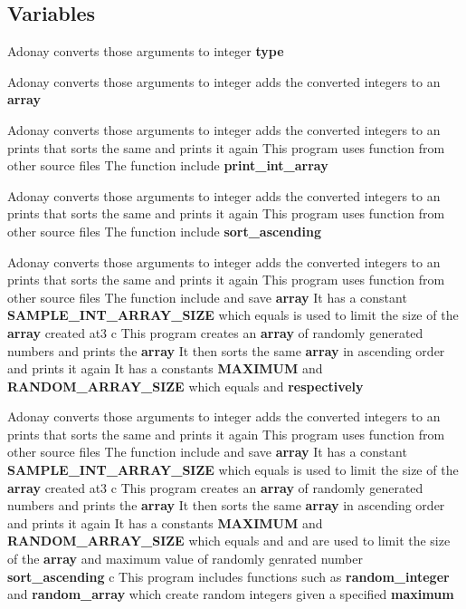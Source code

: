 \subsection*{Variables}
\begin{DoxyCompactItemize}
\item 
Adonay converts those arguments to integer {\bf type}
\item 
Adonay converts those arguments to integer adds the converted integers to an {\bf array}
\item 
Adonay converts those arguments to integer adds the converted integers to an prints that sorts the same and prints it again This program uses function from other source files The function include {\bf print\+\_\+int\+\_\+array}
\item 
Adonay converts those arguments to integer adds the converted integers to an prints that sorts the same and prints it again This program uses function from other source files The function include {\bf sort\+\_\+ascending}
\item 
Adonay converts those arguments to integer adds the converted integers to an prints that sorts the same and prints it again This program uses function from other source files The function include and save {\bf array} It has a constant {\bf S\+A\+M\+P\+L\+E\+\_\+\+I\+N\+T\+\_\+\+A\+R\+R\+A\+Y\+\_\+\+S\+I\+ZE} which equals is used to limit the size of the {\bf array} created at3 c This program creates an {\bf array} of randomly generated numbers and prints the {\bf array} It then sorts the same {\bf array} in ascending order and prints it again It has a constants {\bf M\+A\+X\+I\+M\+UM} and {\bf R\+A\+N\+D\+O\+M\+\_\+\+A\+R\+R\+A\+Y\+\_\+\+S\+I\+ZE} which equals and {\bf respectively}
\item 
Adonay converts those arguments to integer adds the converted integers to an prints that sorts the same and prints it again This program uses function from other source files The function include and save {\bf array} It has a constant {\bf S\+A\+M\+P\+L\+E\+\_\+\+I\+N\+T\+\_\+\+A\+R\+R\+A\+Y\+\_\+\+S\+I\+ZE} which equals is used to limit the size of the {\bf array} created at3 c This program creates an {\bf array} of randomly generated numbers and prints the {\bf array} It then sorts the same {\bf array} in ascending order and prints it again It has a constants {\bf M\+A\+X\+I\+M\+UM} and {\bf R\+A\+N\+D\+O\+M\+\_\+\+A\+R\+R\+A\+Y\+\_\+\+S\+I\+ZE} which equals and and are used to limit the size of the {\bf array} and maximum value of randomly genrated number {\bf sort\+\_\+ascending} c This program includes functions such as {\bf random\+\_\+integer} and {\bf random\+\_\+array} which create random integers given a specified {\bf maximum}
\end{DoxyCompactItemize}



